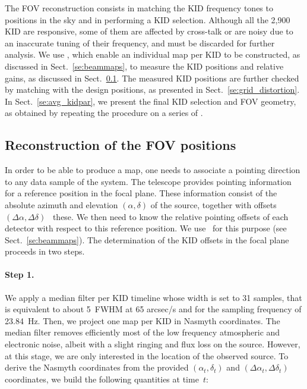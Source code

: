 
The FOV reconstruction consists in matching the KID frequency tones
to positions in the sky and in performing a KID selection. Although all
the 2,900 KID are responsive, some of them are affected by
cross-talk or are noisy due to an inaccurate tuning of their
frequency, and must be discarded for further analysis. We use \bms,
which enable an individual map per KID to be constructed, as discussed in
Sect.~\ref{se:beammaps}, to measure the KID positions and relative gains, as
discussed in Sect.~\ref{se:fov_geometry}. The measured KID positions
are further
checked by matching with the design positions, as presented in
Sect.~\ref{se:grid_distortion}. In Sect.~\ref{se:avg_kidpar}, we
present the final KID selection and FOV geometry, as obtained by
repeating the procedure on a series of \bms.  



\subsection{Reconstruction of the FOV positions}
\label{se:fov_geometry}

In order to be able to produce a map, one needs to associate a pointing
direction to any data sample of the system. The telescope provides
pointing information for a reference position in the focal
plane. These information consist of the
absolute azimuth and elevation $(\alpha,\delta)$ of the source, together with
offsets $(\Delta\alpha, \Delta\delta)$ \wrt~these.
We then need to know the relative pointing offsets of each detector
with respect to this reference position. We use
\bms\ for this purpose (see Sect.~\ref{se:beammaps}). The determination of the
KID offsets in the focal plane proceeds in two steps.

\paragraph{Step 1.} We apply a median filter per
KID timeline whose width is set to 31 samples, that is equivalent to
about 5~FWHM at 65 arcsec/s and for the sampling frequency of
23.84~Hz. Then, we project one map per KID in Nasmyth
coordinates. The median filter removes
efficiently most of the low frequency atmospheric and electronic
noise, albeit with a slight ringing and flux loss on the
source. However, at this stage, we are only interested in the location
of the observed source.
To derive the Nasmyth coordinates from the
provided $(\alpha_t,\delta_t)$ and $(\Delta\alpha_t,\Delta\delta_t)$
coordinates, we build the following quantities at time~$t$:

